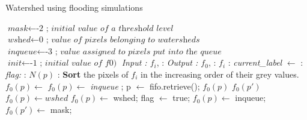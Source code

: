 \documentclass{article}
\begin{document}
\begin{algorithm}[H]
\caption{Watershed using flooding simulations}\label{euclid}
\begin{algorithmic}[1]
\label{alg:immersion_alg}
\State $\textit{mask} \gets \text{-2  ;  }  \textit{initial value of a threshold level}$
\State $\textit{wshed} \gets \text{0  ;  }  \textit{value of pixels belonging to watersheds}$
\State $\textit{inqueue} \gets \text{-3  ;  } \textit{value assigned to pixels put into the queue}$
\State $\textit{init} \gets \text{-1  ;  } \textit{initial value of f0)}$
\newline
\BState \emph{Input : $f_i$}, :
\BState \emph{Output : $f_0$}, :
\newline
{}
\BState {} \emph{$f_i$} :
\BState \emph{current\_label} $\gets$ :
\BState \emph{flag: } :
\BState \emph{$N(p)$} :
\EndProcedure
\newline
\BState \textbf{Sort} the pixels of $f_i$ in the increasing order of their grey values. \newline
{}
        \BState $f_{0}(p) \gets$ 
            \BState \emph{$f_{0}(p) \gets$ inqueue}
            ;
        \EndIf
    \EndFor
\EndFor
{}
    \BState p $\gets$ fifo.retrieve();
                \State $f_{0}(p)$ \gets $f_{0}(p')$
                \State $f_{0}(p) \gets wshed$
            \EndIf
        \EndIf
                \State $f_{0}(p) \gets$ wshed;
                \State flag $\gets$ true;
            \EndIf
            \State $f_{0}(p) \gets$ inqueue;
            \State $f_{0}(p') \gets$ mask;
        \EndIf
    \EndFor

\end{algorithmic}
\end{algorithm}
\end{document}
